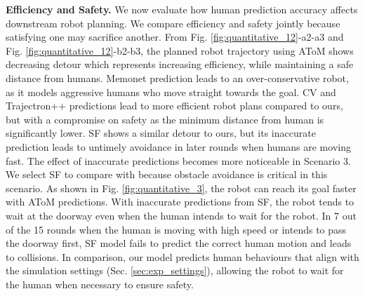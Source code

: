 \textbf{Efficiency and Safety.}
We now evaluate how human prediction accuracy affects downstream robot planning. We compare efficiency and safety jointly because satisfying one may sacrifice another. 
From Fig. \ref{fig:quantitative_12}-a2-a3 and Fig. \ref{fig:quantitative_12}-b2-b3, the planned robot trajectory using AToM shows decreasing detour which represents increasing efficiency, while maintaining a safe distance from humans. 
Memonet prediction leads to an over-conservative robot, as it models aggressive humans who move straight towards the goal. 
CV and Trajectron++ predictions lead to more efficient robot plans compared to ours, but with a compromise on safety as the minimum distance from human is significantly lower. 
SF shows a similar detour to ours, but its inaccurate prediction leads to untimely avoidance in later rounds when humans are moving fast. 
The effect of inaccurate predictions becomes more noticeable in Scenario 3. We select SF to compare with because obstacle avoidance is critical in this scenario. As shown in Fig. \ref{fig:quantitative_3}, the robot can reach its goal faster with AToM predictions. With inaccurate predictions from SF, the robot tends to wait at the doorway even when the human intends to wait for the robot. 
In 7 out of the 15 rounds when the human is moving with high speed or intends to pass the doorway first, SF model fails to predict the correct human motion and leads to collisions. 
In comparison, our model predicts human behaviours that align with the simulation settings (Sec. \ref{sec:exp_settings}), allowing the robot to wait for the human when necessary to ensure safety.


